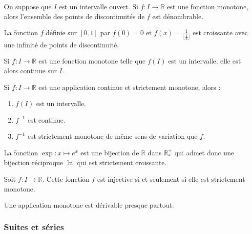   \begin{theorem}
    On suppose que $I$ est un intervalle ouvert. Si $f : I \rightarrow \mathbb{R}$ est une fonction monotone, alors l'ensemble des points de discontinuités de $f$ est dénombrable.
  \end{theorem}

  \begin{example}
    La fonction $f$ définie sur $[0,1]$ par $f(0) = 0$ et $f(x) = \frac{1}{\lfloor \frac{1}{x} \rfloor}$ est croissante avec une infinité de points de discontinuité.
  \end{example}


  \begin{proposition}
    Si $f : I \rightarrow \mathbb{R}$ est une fonction monotone telle que $f(I)$ est un intervalle, elle est alors continue sur $I$.
  \end{proposition}

  \begin{theorem}[Bijection]
    Si $f : I \rightarrow \mathbb{R}$ est une application continue et strictement monotone, alors :
    \begin{enumerate}[label=(\roman*)]
      \item $f(I)$ est un intervalle.
      \item $f^{-1}$ est continue.
      \item $f^{-1}$ est strictement monotone de même sens de variation que $f$.
    \end{enumerate}
  \end{theorem}

  \begin{example}
    La fonction $\exp : x \mapsto e^x$ est une bijection de $\mathbb{R}$ dans $\mathbb{R}^{+}_{*}$ qui admet donc une bijection réciproque $\ln$ qui est strictement croissante.
  \end{example}

  \begin{proposition}
    Soit $f : I \rightarrow \mathbb{R}$. Cette fonction $f$ est injective si et seulement si elle est strictement monotone.
  \end{proposition}


  \begin{theorem}[Lebesgue]
    Une application monotone est dérivable presque partout.
  \end{theorem}

  \subsubsection{Suites et séries}

